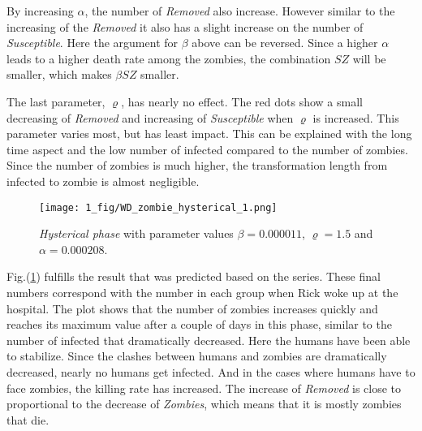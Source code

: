 \documentclass[%
twoside,                 %
final,                   %
chapterprefix=true,      %
open=right               %
10pt]{book}
\begin{document}
\vspace{3mm}




\vspace{3mm}


By increasing $\alpha$, the number of \emph{Removed} also increase. However similar to the increasing of the \emph{Removed} it also has a slight increase on the number of \emph{Susceptible}. Here the argument for $\beta$ above can be reversed. Since a higher $\alpha$ leads to a higher death rate among the zombies, the combination $SZ$ will be smaller, which makes $\beta SZ$ smaller.


\vspace{3mm}




\vspace{3mm}


The last parameter, $\varrho$, has nearly no effect. The red dots show a small decreasing of \emph{Removed} and increasing of \emph{Susceptible}  when $\varrho$ is increased. This parameter varies most, but has least impact. This can be explained with the long time aspect and the low number of infected compared to the number of zombies. Since the number of zombies is much higher, the transformation length from infected to zombie is almost negligible.  


\begin{figure}[ht]
  \centerline{\texttt{[image: 1\_fig/WD\_zombie\_hysterical\_1.png]}}
  \caption{
  \label{fig:hysterical_1} \emph{Hysterical phase} with parameter values $\beta = 0.000011$, $\varrho = 1.5$ and $\alpha = 0.000208$.
  }
\end{figure}


Fig.(\ref{fig:hysterical_1}) fulfills the result that was predicted based on the series. These final numbers correspond with the number in each group when Rick woke up at the hospital. The plot shows that the number of zombies increases quickly and reaches its maximum value after a couple of days in this phase, similar to the number of infected that dramatically decreased. Here the humans have been able to stabilize. Since the clashes between humans and zombies are dramatically decreased, nearly no humans get infected. And in the cases where humans have to face zombies, the killing rate has increased. The increase of \emph{Removed} is close to proportional to the decrease of \emph{Zombies}, which means that it is mostly zombies that die.
\end{document}
